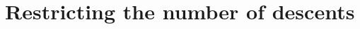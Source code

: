 \documentclass[12pt]{article}
\theoremstyle{definition}
\begin{document}
		
		
		
		
		
		
		
		
		
		


\section{Restricting the number of descents}\label{sec:lsd}
\end{document}
